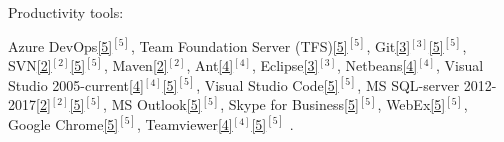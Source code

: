 \begin{cventries}
  \cventry
    {Productivity tools:} %
    {} %
    {} %
    {} %
    {
      \begin{cvitems} %
        \item {        
		Azure DevOps\ref{5}{$^{[5]}$},         
        Team Foundation Server (TFS)\ref{5}{$^{[5]}$},
        Git\ref{3}{$^{[3]}$}\ref{5}{$^{[5]}$}, 
        SVN\ref{2}{$^{[2]}$}\ref{5}{$^{[5]}$},  
        Maven\ref{2}{$^{[2]}$},
        Ant\ref{4}{$^{[4]}$},  
        Eclipse\ref{3}{$^{[3]}$},  
        Netbeans\ref{4}{$^{[4]}$}, 
        Visual Studio 2005-current\ref{4}{$^{[4]}$}\ref{5}{$^{[5]}$},
        Visual Studio Code\ref{5}{$^{[5]}$},
        MS SQL-server 2012-2017\ref{2}{$^{[2]}$}\ref{5}{$^{[5]}$},
        MS Outlook\ref{5}{$^{[5]}$},
        Skype for Business\ref{5}{$^{[5]}$},
        WebEx\ref{5}{$^{[5]}$},
        Google Chrome\ref{5}{$^{[5]}$},
        Teamviewer\ref{4}{$^{[4]}$}\ref{5}{$^{[5]}$}%
        .}       
      \end{cvitems}
    }  
  \vspace{-0.4cm}  
    

\end{cventries}
